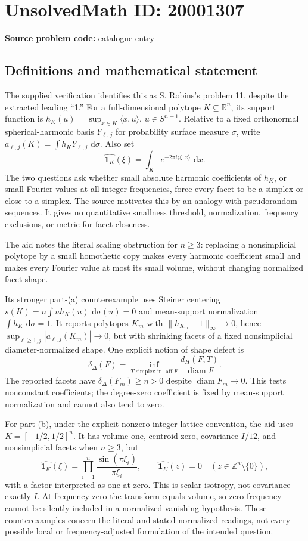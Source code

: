\documentclass[11pt]{article}
\newcommand{\Z}{\mathbb{Z}}
\newcommand{\R}{\mathbb{R}}
\newcommand{\dd}{\,\mathrm{d}}
\begin{document}
\section*{UnsolvedMath ID: 20001307}
\textbf{Source problem code:} catalogue entry
\subsection{Definitions and mathematical statement}
The supplied verification identifies this as S. Robins's problem 11, despite the extracted leading ``1.'' For a full-dimensional polytope $K\subseteq\R^n$, its support function is $h_K(u)=\sup_{x\in K}\langle x,u\rangle$, $u\in S^{n-1}$. Relative to a fixed orthonormal spherical-harmonic basis $Y_{\ell,j}$ for probability surface measure $\sigma$, write $a_{\ell,j}(K)=\int h_KY_{\ell,j}\,\dd\sigma$. Also set
\[
 \widehat{\mathbf1_K}(\xi)=\int_K e^{-2\pi i\langle\xi,x\rangle}\,\dd x.
\]
The two questions ask whether small absolute harmonic coefficients of $h_K$, or small Fourier values at all integer frequencies, force every facet to be a simplex or close to a simplex. The source motivates this by an analogy with pseudorandom sequences. It gives no quantitative smallness threshold, normalization, frequency exclusions, or metric for facet closeness.

The aid notes the literal scaling obstruction for $n\geq3$: replacing a nonsimplicial polytope by a small homothetic copy makes every harmonic coefficient small and makes every Fourier value at most its small volume, without changing normalized facet shape.

Its stronger part-(a) counterexample uses Steiner centering $s(K)=n\int u h_K(u)\,\dd\sigma(u)=0$ and mean-support normalization $\int h_K\,\dd\sigma=1$. It reports polytopes $K_m$ with $\|h_{K_m}-1\|_\infty\to0$, hence $\sup_{\ell\geq1,j}|a_{\ell,j}(K_m)|\to0$, but with shrinking facets of a fixed nonsimplicial diameter-normalized shape. One explicit notion of shape defect is
\[
 \delta_\Delta(F)=\inf_{T\text{ simplex in }\operatorname{aff}F}
 \frac{d_H(F,T)}{\operatorname{diam}F}.
\]
The reported facets have $\delta_\Delta(F_m)\geq\eta>0$ despite $\operatorname{diam}F_m\to0$. This tests nonconstant coefficients; the degree-zero coefficient is fixed by mean-support normalization and cannot also tend to zero.

For part (b), under the explicit nonzero integer-lattice convention, the aid uses $K=[-1/2,1/2]^n$. It has volume one, centroid zero, covariance $I/12$, and nonsimplicial facets when $n\geq3$, but
\[
 \widehat{\mathbf1_K}(\xi)=\prod_{i=1}^n\frac{\sin(\pi\xi_i)}{\pi\xi_i},\qquad
 \widehat{\mathbf1_K}(z)=0\quad(z\in\Z^n\setminus\{0\}),
\]
with a factor interpreted as one at zero. This is scalar isotropy, not covariance exactly $I$. At frequency zero the transform equals volume, so zero frequency cannot be silently included in a normalized vanishing hypothesis. These counterexamples concern the literal and stated normalized readings, not every possible local or frequency-adjusted formulation of the intended question.
\end{document}
